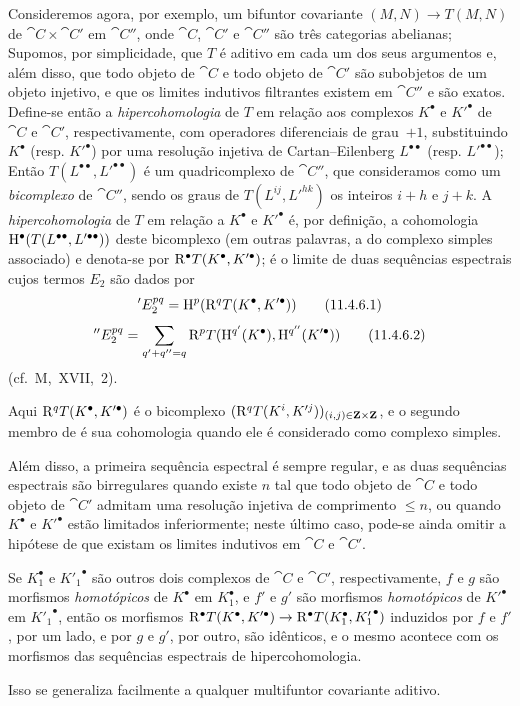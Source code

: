 \begin{env}[11.4.6]
\label{0.11.4.6}
Consideremos agora, por exemplo, um bifuntor covariante $(M, N) \rightarrow T(M, N)$ de $\cat{C} \times \cat{C}'$ em $\cat{C}''$, onde $\cat{C}$, $\cat{C}'$ e $\cat{C}''$ são três categorias abelianas;
Supomos, por simplicidade, que $T$ é aditivo em cada um dos seus argumentos e, além disso, que todo objeto de $\cat{C}$ e todo objeto de $\cat{C}'$ são subobjetos de um objeto injetivo,
e que os limites indutivos filtrantes existem em $\cat{C}''$ e são exatos.
Define-se então a \emph{hipercohomologia} de $T$ em relação aos complexos $K^\bullet$ e $K'^\bullet$ de $\cat{C}$ e $\cat{C}'$, respectivamente, com operadores diferenciais de grau~$+1$, substituindo $K^\bullet$ (resp. $K'^\bullet$) por uma resolução injetiva de Cartan--Eilenberg $L^{\bullet\bullet}$ (resp. $L'^{\bullet\bullet}$);
Então $T(L^{\bullet\bullet}, L'^{\bullet\bullet})$ é um quadricomplexo de $\cat{C}''$, que consideramos como um \emph{bicomplexo} de $\cat{C}''$, sendo os graus de $T(L^{ij}, L'^{hk})$ os inteiros $i+h$ e $j+k$.
A \emph{hipercohomologia} de $T$ em relação a $K^\bullet$ e $K'^\bullet$ é, por definição, a cohomologia $\mathrm{H}^\bullet(T(L^{\bullet\bullet}, L'^{\bullet\bullet}))$ deste bicomplexo (em outras palavras, a do complexo simples associado) e denota-se por $\mathrm{R}^\bullet T(K^\bullet, K'^\bullet)$;
é o limite de duas sequências espectrais cujos termos $E_2$ são dados por
\[
\label{0.11.4.6.1}
  'E_2^{pq}
  = \HH^p(\RR^q T(K^\bullet, K'^\bullet))
\tag{11.4.6.1}
\]
\[
\label{0.11.4.6.2}
  ''E_2^{pq}
  = \sum_{q'+q''=q}\RR^p T(\HH^{q'}(K^\bullet),\HH^{q''}(K'^\bullet))
\tag{11.4.6.2}
\]
(cf.~M,~XVII,~2).

Aqui $\mathrm{R}^q T(K^\bullet, K'^\bullet)$ é o bicomplexo $(\mathrm{R}^q T(K^i, K'^j))_{(i,j)\in \mathbf{Z}\times \mathbf{Z}}$, e o segundo membro de  é sua cohomologia quando ele é considerado como complexo simples.

Além disso, a primeira sequência espectral é sempre regular, e as duas sequências espectrais são birregulares quando existe $n$ tal que todo objeto de $\cat{C}$ e todo objeto de $\cat{C}'$ admitam uma resolução injetiva de comprimento $\leq n$, ou quando $K^\bullet$ e $K'^\bullet$ estão limitados inferiormente;
neste último caso, pode-se ainda omitir a hipótese de que existam os limites indutivos em $\cat{C}$ e $\cat{C}'$.

Se $K_1^\bullet$ e ${K'_1}^\bullet$ são outros dois complexos de $\cat{C}$ e $\cat{C}'$, respectivamente, $f$ e $g$ são morfismos \emph{homotópicos } de $K^\bullet$ em $K_1^\bullet$,
e $f'$ e $g'$ são morfismos \emph{homotópicos} de $K'^\bullet$ em ${K'_1}^\bullet$, então os morfismos $\mathrm{R}^\bullet  T(K^\bullet, K'^\bullet) \rightarrow \mathrm{R}^\bullet  T(K_1^\bullet, {K'_1}^\bullet)$ induzidos por $f$ e $f'$, por um lado, e por $g$ e $g'$, por outro, são idênticos, e o mesmo acontece com os morfismos das sequências espectrais de hipercohomologia.

Isso se generaliza facilmente a qualquer multifuntor covariante aditivo.
\end{env}

